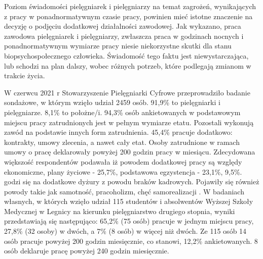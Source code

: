 \documentclass[a4paper,12pt,twoside,openright]{mwrep}
\begin{document}
Poziom świadomości pielęgniarek i pielęgniarzy na temat zagrożeń, wynikających z pracy w ponadnormatywnym czasie pracy, powinien mieć istotne znaczenie na decyzję o podjęciu dodatkowej działalności zawodowej. 
Jak wykazano, praca zawodowa pielęgniarek i pielęgniarzy, zwłaszcza praca w godzinach nocnych i ponadnormatywnym wymiarze pracy niesie niekorzystne skutki dla stanu biopsychospołecznego człowieka. Świadomość tego faktu jest niewystarczająca, lub schodzi na plan dalszy, wobec różnych potrzeb, które podlegają zmianom w trakcie życia.

W czerwcu 2021 r Stowarzyszenie Pielęgniarki Cyfrowe przeprowadziło badanie sondażowe, w którym wzięło udział 2459 osób. 91,9\% to pielęgniarki i pielęgniarze. 8,1\% to położne/i.  94,3\%   osób ankietowanych w podstawowym miejscu pracy zatrudnionych jest w pełnym wymiarze etatu. Pozostali wykonują zawód na podstawie innych form zatrudnienia. 45,4\%  pracuje dodatkowo: kontrakty, umowy zlecenia, a nawet cały etat. Osoby zatrudnione w ramach umowy o pracę deklarowały powyżej 200 godzin pracy w miesiącu. Zdecydowana większość respondentów podawała iż powodem dodatkowej pracy są względy ekonomiczne, plany życiowe - 25,7\%,  podstawowa egzystencja -  23,1\%, 9,5\%. godzi się na dodatkowe dyżury z powodu braków kadrowych. Pojawiły się również powody takie jak samotność, pracoholizm, chęć samorealizacji \cite{cyfrowe}. W badaniach własnych, w których wzięło udział 115 studentów i absolwentów Wyższej Szkoły Medycznej  w Legnicy na kierunku pielęgniarstwo drugiego stopnia, wyniki  przedstawiają się następująco: 65,2\% (75 osób) pracuje w jednym miejscu pracy, 27,8\%  (32 osoby) w dwóch, a 7\%  (8 osób) w więcej niż dwóch.  Ze 115 osób 14 osób pracuje powyżej 200 godzin miesięcznie, co stanowi, 12,2\% ankietowanych. 8 osób deklaruje pracę powyżej  240 godzin miesięcznie.
\end{document}
